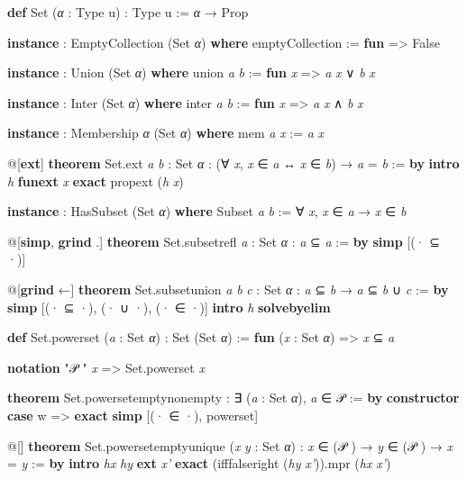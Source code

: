 \documentclass[oneside]{memoir}
\newcommand{\coloredwave}[2]{\textcolor{#1}{\uwave{\textcolor{black}{#2}}}}
\newcommand{\infoDecorate}[1]{\coloredwave{infoColor}{#1}}
\begin{document}
\begin{LeanVerbatim}
\textbf{def} Set (\textit{α} : Type u) : Type u := \textit{α} → Prop

\textbf{instance} : EmptyCollection (Set \textit{α}) \textbf{where}
  emptyCollection := \textbf{fun}  => False

\textbf{instance} : Union (Set \textit{α}) \textbf{where}
  union \textit{a} \textit{b} := \textbf{fun} \textit{x} => \textit{a} \textit{x} ∨ \textit{b} \textit{x}

\textbf{instance} : Inter (Set \textit{α}) \textbf{where}
  inter \textit{a} \textit{b} := \textbf{fun} \textit{x} => \textit{a} \textit{x} ∧ \textit{b} \textit{x}

\textbf{instance} : Membership \textit{α} (Set \textit{α}) \textbf{where}
  mem \textit{a} \textit{x} := \textit{a} \textit{x}

@[\textbf{ext}]
\textbf{theorem} Set.ext \textit{a} \textit{b} : Set \textit{α} :
    (∀ \textit{x}, \textit{x} ∈ \textit{a} ↔ \textit{x} ∈ \textit{b}) → \textit{a} = \textit{b} := \textbf{by}
  \textbf{intro} \textit{h}
  \textbf{funext} \textit{x}
  \textbf{exact} propext (\textit{h} \textit{x})

\textbf{instance} : HasSubset (Set \textit{α}) \textbf{where}
  Subset \textit{a} \textit{b} := ∀ \textit{x}, \textit{x} ∈ \textit{a} → \textit{x} ∈ \textit{b}

@[\textbf{simp}, \textbf{grind} .]
\textbf{theorem} Set.subsetrefl \textit{a} : Set \textit{α} : \textit{a} ⊆ \textit{a} := \textbf{by}
  \textbf{simp} [(· ⊆ ·)]

@[\textbf{grind} ←]
\textbf{theorem} Set.subsetunion \textit{a} \textit{b} \textit{c} : Set \textit{α} :
    \textit{a} ⊆ \textit{b} → \textit{a} ⊆ \textit{b} ∪ \textit{c} := \textbf{by}
  \textbf{simp} [(· ⊆ ·), (· ∪ ·), (· ∈ ·)]
  \textbf{intro} \textit{h}
  \textbf{solvebyelim}

\textbf{def} Set.powerset (\textit{a} : Set \textit{α}) : Set (Set \textit{α}) :=
  \textbf{fun} (\textit{x} : Set \textit{α}) => \textit{x} ⊆ \textit{a}

\textbf{notation} "𝒫 " \textit{x} => Set.powerset \textit{x}

\textbf{theorem} Set.powersetemptynonempty :
    ∃ (\textit{a} : Set \textit{α}), \textit{a} ∈ 𝒫  := \textbf{by}
  \textbf{constructor}
  \textbf{case} w => \textbf{exact} 
  \textbf{simp} [(· ∈ ·), powerset]

@[\infoDecorate{\textbf{grind?} →}]
\textbf{theorem} Set.powersetemptyunique (\textit{x} \textit{y} : Set \textit{α}) :
    \textit{x} ∈ (𝒫 ) → \textit{y} ∈ (𝒫 ) → \textit{x} = \textit{y} := \textbf{by}
  \textbf{intro} \textit{hx} \textit{hy}
  \textbf{ext} \textit{x'}
  \textbf{exact} (ifffalseright (\textit{hy} \textit{x'})).mpr (\textit{hx} \textit{x'})

\end{LeanVerbatim}
\end{document}

